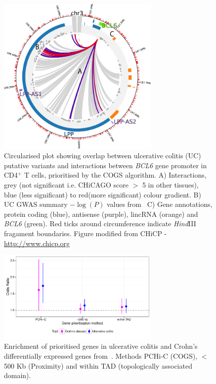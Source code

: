 \documentclass[a4paper,11pt]{report}
\begin{document}
\begin{figure}[ht]
\centering
\includegraphics[width=0.7\textwidth]{CHiCP-BCL6-Naive_CD4.pdf}
\caption{Circularised plot showing overlap between ulcerative colitis (UC) putative variants and  interactions between \textit{BCL6} gene promoter in CD4$^+$ T cells, prioritised by the COGS algorithm. A) Interactions, grey (not significant i.e. CHiCAGO score $>$ 5 in other tissues), blue (less significant) to red(more significant) colour gradient. B) UC GWAS summary $-\log(P)$ values from~\citet{Anderson2011-ch} C)  Gene annotations, protein coding (blue), antisense (purple), lincRNA (orange) and \textit{BCL6} (green). Red ticks around circumference indicate \textit{Hind}III fragament boundaries. Figure modified from CHiCP - \url{http://www.chicp.org}~\citep{SchofieldCarverAchuthanEtAl2016} }
\label{fig:bcl6}
\end{figure}

\begin{figure}[ht]
\centering
\includegraphics[width=0.7\textwidth]{ibd-tadprox.pdf}
\caption{Enrichment of prioritised genes in ulcerative colitis and Crohn's differentially expressed genes from~\citet{PetersLyonsLeeEtAl2016}. Methods PCHi-C (COGS), $<$ 500 Kb (Proximity) and within TAD (topologically associated domain).}
\label{fig:peters_odds_ratio}
\end{figure}
\end{document}
